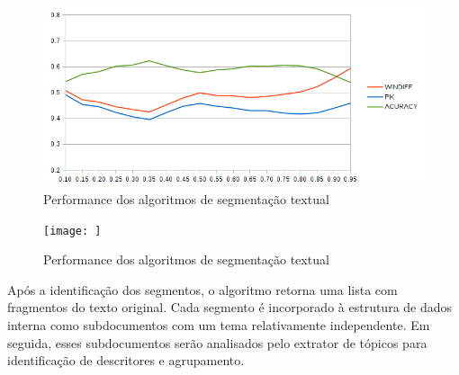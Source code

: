   
  \begin{figure}[!h]
	  \centering
	  \includegraphics[width=1\textwidth]{conteudo/capitulos/figs/graficos/analiseNSegRate-C99.png}
	  \caption{Performance dos algoritmos de segmentação textual}
	  \label{fig:grafico-medidas-tradicionais}
  \end{figure}


  
  \begin{figure}[!h]
	  \centering
	  \texttt{[image: ]}
	  \caption{Performance dos algoritmos de segmentação textual}
	  \label{fig:grafico-medidas-tradicionais}
  \end{figure}










Após a identificação dos segmentos, o algoritmo retorna uma lista com fragmentos do texto original. Cada segmento é incorporado à estrutura de dados interna como subdocumentos com um tema relativamente independente. Em seguida, esses subdocumentos serão analisados pelo extrator de tópicos para identificação de descritores e agrupamento.
















